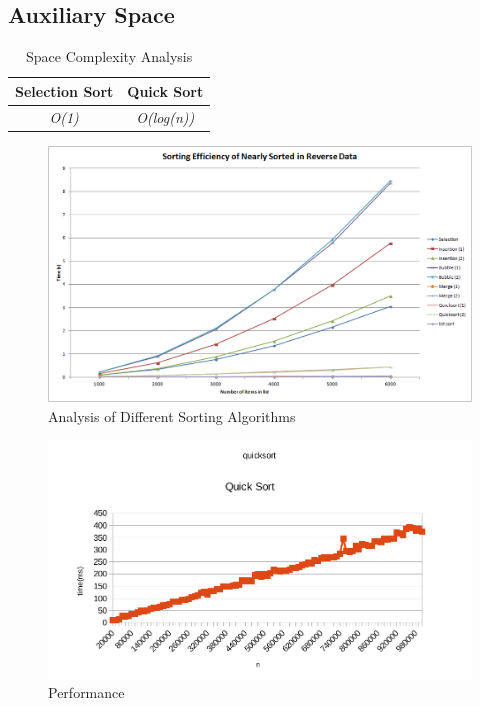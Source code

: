 \documentclass[12pt]{article}
\begin{document}
\subsection{Auxiliary Space}
\begin{table}[h]
    \centering
   \begin{tabular}{|c|c|}
\hline
Selection Sort & Quick Sort \\
\hline 
\textit{O(1)} & \textit{O(log(n))}\\
\hline
\end{tabular}
    \caption{Space Complexity Analysis}
    \label{tab:my_label}
\end{table}
\begin{figure}[h]
        \begin{center}
                \includegraphics[scale=0.5]{graph3}
        \end{center}
        \caption{Analysis of Different Sorting Algorithms}
        \label{fig:shapes}
\end{figure}
\newpage
\begin{figure}[h]
        \begin{center}
                \includegraphics[scale=0.5]{XxdQf}
        \end{center}
        \caption{Performance}
        \label{fig:shapes}
\end{figure}
\end{document}
